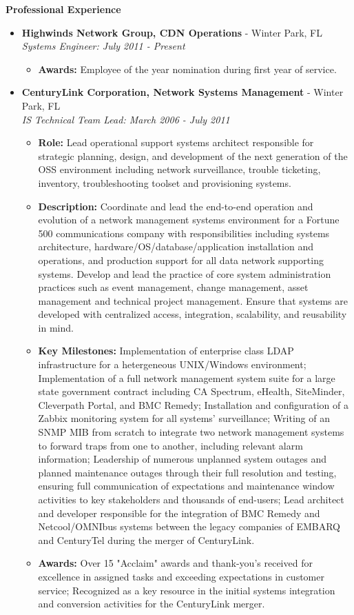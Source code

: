 \documentclass[10pt,oneside]{article}
\newenvironment{ressection}[1]{
	\vspace{4pt}
	\textbf{\selectfont\normalsize#1}
	\begin{itemize}
	\vspace{3pt}
}{
	\end{itemize}
}
\newcommand{\ressubitem}[1]{
	\vspace{-1pt}
	\item \begin{flushleft} #1 \end{flushleft}
}
\newcommand{\resbigitem}[3]{
	\vspace{-5pt}
	\item
	\textbf{#1} - #2 \\
	\textit{#3}
}
\newenvironment{ressubsec}[3]{
	\resbigitem{#1}{#2}{#3}
	\vspace{-2pt}
	\begin{itemize}
}{
	\end{itemize}
}
\begin{document}
\begin{ressection}{Professional Experience}
\begin{ressubsec}{Highwinds Network Group, CDN Operations}{Winter Park, FL}{Systems Engineer: July 2011 - Present}
		\ressubitem{\textbf{Awards:} Employee of the year nomination during first year of service.}

	\end{ressubsec}

	\begin{ressubsec}{CenturyLink Corporation, Network Systems Management}{Winter Park, FL}{IS Technical Team Lead: March 2006 - July 2011}

		\ressubitem{\textbf{Role:} Lead operational support systems architect responsible for strategic planning, design, and development of the next generation of the OSS environment including network surveillance, trouble ticketing, inventory, troubleshooting toolset and provisioning systems.}
		
		\ressubitem{\textbf{Description:} Coordinate and lead the end-to-end operation and evolution of a network management systems environment for a Fortune 500 communications company with responsibilities including systems architecture, hardware/OS/database/application installation and operations, and production support for all data network supporting systems.  Develop and lead the practice of core system administration practices such as event management, change management, asset management and technical project management. Ensure that systems are developed with centralized access, integration, scalability, and reusability in mind.}

		\ressubitem{\textbf{Key Milestones:} Implementation of enterprise class LDAP infrastructure for a hetergeneous UNIX/Windows environment; Implementation of a full network management system suite for a large state government contract including CA Spectrum, eHealth, SiteMinder, Cleverpath Portal, and BMC Remedy; Installation and configuration of a Zabbix monitoring system for all systems' surveillance; Writing of an SNMP MIB from scratch to integrate two network management systems to forward traps from one to another, including relevant alarm information; Leadership of numerous unplanned system outages and planned maintenance outages through their full resolution and testing, ensuring full communication of expectations and maintenance window activities to key stakeholders and thousands of end-users; Lead architect and developer responsible for the integration of BMC Remedy and Netcool/OMNIbus systems between the legacy companies of EMBARQ and CenturyTel during the merger of CenturyLink.}
		
		\ressubitem{\textbf{Awards:} Over 15 "Acclaim" awards and thank-you's received for excellence in assigned tasks and exceeding expectations in customer service; Recognized as a key resource in the initial systems integration and conversion activities for the CenturyLink merger.}


\end{ressubsec}
\end{ressection}
\end{document}
